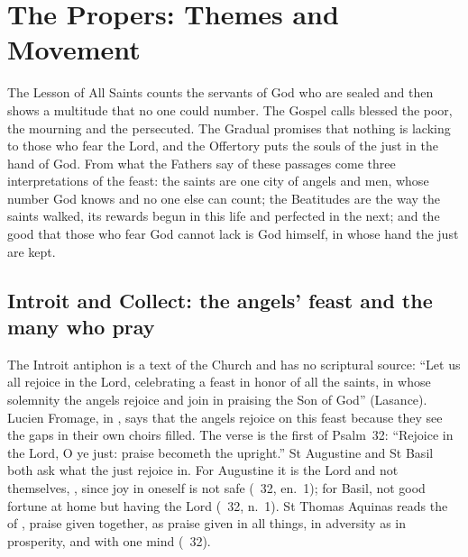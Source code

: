 
\section{The Propers: Themes and Movement}

The Lesson of All Saints counts the servants of God who are sealed and then
shows a multitude that no one could number. The Gospel calls blessed the poor,
the mourning and the persecuted. The Gradual promises that nothing is lacking
to those who fear the Lord, and the Offertory puts the souls of the just in
the hand of God. From what the Fathers say of these passages come three
interpretations of the feast: the saints are one city of angels and men,
whose number God knows and no one else can count; the Beatitudes are the way
the saints walked, its rewards begun in this life and perfected in the next;
and the good that those who fear God cannot lack is God himself, in whose hand
the just are kept.

\subsection{Introit and Collect: the angels' feast and the many who pray}

The Introit antiphon is a text of the Church and has no scriptural source:
``Let us all rejoice in the Lord, celebrating a feast in honor of all the
saints, in whose solemnity the angels rejoice and join in praising the Son of
God'' (Lasance). Lucien Fromage, in , says that the angels rejoice on this feast because
they see the gaps in their own choirs filled. The verse is the first of
Psalm~32: ``Rejoice in the Lord, O ye just: praise becometh the upright.''
St Augustine and St Basil both ask what the just rejoice in. For Augustine it
is the Lord and not themselves, ,
since joy in oneself is not safe (\ 32, en.~1); for
Basil, not good fortune at home but having the Lord (\ 32,
n.~1). St Thomas Aquinas reads the  of ,
praise given together, as praise given in all things, in adversity as in
prosperity, and with one mind (\ 32).

